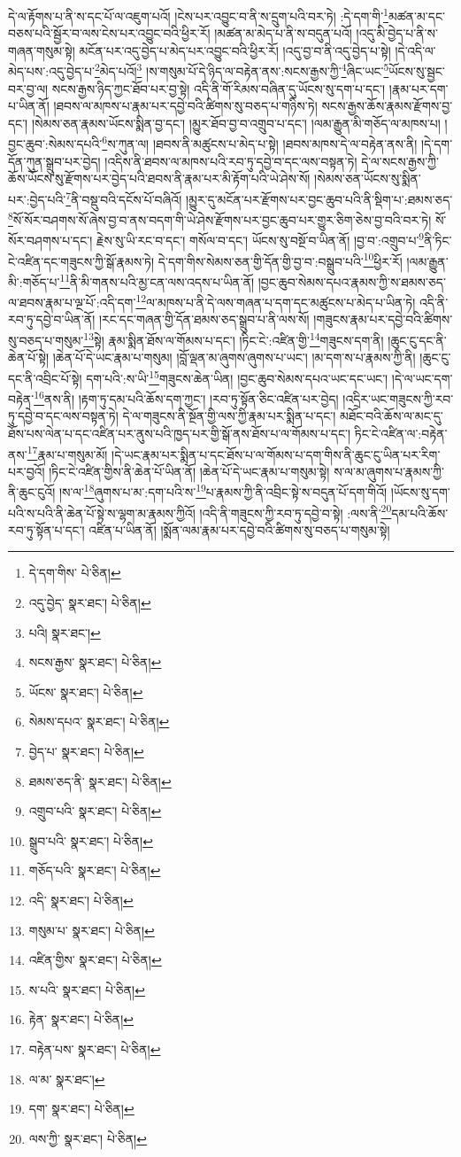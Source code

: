 དེ་ལ་རྟོགས་པ་ནི་ས་དང་པོ་ལ་འཇུག་པའོ། །ངེས་པར་འབྱུང་བ་ནི་ས་དྲུག་པའི་བར་ཏེ། :དེ་དག་གི་\footnote{དེ་དག་གིས་  པེ་ཅིན། }མཚན་མ་དང་བཅས་པའི་སྦྱོར་བ་ལས་ངེས་པར་འབྱུང་བའི་ཕྱིར་རོ། །མཚན་མ་མེད་པ་ནི་ས་བདུན་པའོ། །འདུ་མི་བྱེད་པ་ནི་ས་གཞན་གསུམ་སྟེ། མངོན་པར་འདུ་བྱེད་པ་མེད་པར་འབྱུང་བའི་ཕྱིར་རོ། །འདུ་བྱ་བ་ནི་འདུ་བྱེད་པ་སྟེ། །དེ་འདི་ལ་མེད་པས་:འདུ་བྱེད་པ་\footnote{འདུ་བྱེད་  སྣར་ཐང་།  པེ་ཅིན། }མེད་པའོ།\footnote{པའི།  སྣར་ཐང་། } །ས་གསུམ་པོ་དེ་ཉིད་ལ་བརྟེན་ནས་:སངས་རྒྱས་ཀྱི་\footnote{སངས་རྒྱས་  སྣར་ཐང་།  པེ་ཅིན། }ཞིང་ཡང་\footnote{ཡོངས་  སྣར་ཐང་།  པེ་ཅིན། }ཡོངས་སུ་སྦྱང་བར་བྱ་ལ། སངས་རྒྱས་ཉིད་ཀྱང་ཐོབ་པར་བྱ་སྟེ། འདི་ནི་གོ་རིམས་བཞིན་དུ་ཡོངས་སུ་དག་པ་དང་། །རྣམ་པར་དག་པ་ཡིན་ནོ། །ཐབས་ལ་མཁས་པ་རྣམ་པར་དབྱེ་བའི་ཚིགས་སུ་བཅད་པ་གཉིས་ཏེ། སངས་རྒྱས་ཆོས་རྣམས་རྫོགས་བྱ་དང་། །སེམས་ཅན་རྣམས་ཡོངས་སྨིན་བྱ་དང་། །མྱུར་ཐོབ་བྱ་བ་འགྲུབ་པ་དང་། །ལམ་རྒྱུན་མི་གཅོད་ལ་མཁས་པ། །བྱང་ཆུབ་:སེམས་དཔའི་\footnote{སེམས་དཔའ་  སྣར་ཐང་།  པེ་ཅིན། }ས་ཀུན་ལ། །ཐབས་ནི་མཚུངས་པ་མེད་པ་སྟེ། །ཐབས་མཁས་དེ་ལ་བརྟེན་ནས་ནི། །དེ་དག་དོན་ཀུན་སྒྲུབ་པར་བྱེད། །འདིས་ནི་ཐབས་ལ་མཁས་པའི་རབ་ཏུ་དབྱེ་བ་དང་ལས་བསྟན་ཏེ། དེ་ལ་སངས་རྒྱས་ཀྱི་ཆོས་ཡོངས་སུ་རྫོགས་པར་བྱེད་པའི་ཐབས་ནི་རྣམ་པར་མི་རྟོག་པའི་ཡེ་ཤེས་སོ། །སེམས་ཅན་ཡོངས་སུ་སྨིན་པར་:བྱེད་པའི་\footnote{བྱེད་པ་  སྣར་ཐང་།  པེ་ཅིན། }ནི་བསྡུ་བའི་དངོས་པོ་བཞིའོ། །མྱུར་དུ་མངོན་པར་རྫོགས་པར་བྱང་ཆུབ་པའི་ནི་སྡིག་པ་:ཐམས་ཅད་\footnote{ཐམས་ཅད་ནི་  སྣར་ཐང་།  པེ་ཅིན། }སོ་སོར་བཤགས་སོ་ཞེས་བྱ་བ་ནས་བདག་གི་ཡེ་ཤེས་རྫོགས་པར་བྱང་ཆུབ་པར་གྱུར་ཅིག་ཅེས་བྱ་བའི་བར་ཏེ། སོ་སོར་བཤགས་པ་དང་། རྗེས་སུ་ཡི་རང་བ་དང་། གསོལ་བ་དང་། ཡོངས་སུ་བསྔོ་བ་ཡིན་ནོ། །བྱ་བ་:འགྲུབ་པ་\footnote{འགྲུབ་པའི་  སྣར་ཐང་།  པེ་ཅིན། }ནི་ཏིང་ངེ་འཛིན་དང་གཟུངས་ཀྱི་སྒོ་རྣམས་ཏེ། དེ་དག་གིས་སེམས་ཅན་གྱི་དོན་གྱི་བྱ་བ་:བསྒྲུབ་པའི་\footnote{སྒྲུབ་པའི་  སྣར་ཐང་།  པེ་ཅིན། }ཕྱིར་རོ། །ལམ་རྒྱུན་མི་:གཅོད་པ་\footnote{གཅོད་པའི་  སྣར་ཐང་།  པེ་ཅིན། }ནི་མི་གནས་པའི་མྱ་ངན་ལས་འདས་པ་ཡིན་ནོ། །བྱང་ཆུབ་སེམས་དཔའ་རྣམས་ཀྱི་ས་ཐམས་ཅད་ལ་ཐབས་རྣམ་པ་ལྔ་པོ་:འདི་དག་\footnote{འདི་  སྣར་ཐང་།  པེ་ཅིན། }ལ་མཁས་པ་ནི་དེ་ལས་གཞན་པ་དག་དང་མཚུངས་པ་མེད་པ་ཡིན་ཏེ། འདི་ནི་རབ་ཏུ་དབྱེ་བ་ཡིན་ནོ། །རང་དང་གཞན་གྱི་དོན་ཐམས་ཅད་སྒྲུབ་པ་ནི་ལས་སོ། །གཟུངས་རྣམ་པར་དབྱེ་བའི་ཚིགས་སུ་བཅད་པ་གསུམ་\footnote{གསུམ་པ་  སྣར་ཐང་།  པེ་ཅིན། }སྟེ། རྣམ་སྨིན་ཐོས་ལ་གོམས་པ་དང་། །ཏིང་ངེ་:འཛིན་གྱི་\footnote{འཛིན་གྱིས་  སྣར་ཐང་།  པེ་ཅིན། }གཟུངས་དག་ནི། །ཆུང་ངུ་དང་ནི་ཆེན་པོ་སྟེ། །ཆེན་པོ་དེ་ཡང་རྣམ་པ་གསུམ། །བློ་ལྡན་མ་ཞུགས་ཞུགས་པ་ཡང་། །མ་དག་ས་པ་རྣམས་ཀྱི་ནི། །ཆུང་ངུ་དང་ནི་འབྲིང་པོ་སྟེ། དག་པའི་:ས་ཡི་\footnote{ས་པའི་  སྣར་ཐང་།  པེ་ཅིན། }གཟུངས་ཆེན་ཡིན། །བྱང་ཆུབ་སེམས་དཔའ་ཡང་དང་ཡང་། །དེ་ལ་ཡང་དག་བརྟེན་\footnote{རྟེན་  སྣར་ཐང་།  པེ་ཅིན། }ནས་ནི། །རྟག་ཏུ་དམ་པའི་ཆོས་དག་ཀྱང་། །རབ་ཏུ་སྟོན་ཅིང་འཛིན་པར་བྱེད། །འདྲིར་ཡང་གཟུངས་ཀྱི་རབ་ཏུ་དབྱེ་བ་དང་ལས་བསྟན་ཏེ། དེ་ལ་གཟུངས་ནི་སྔོན་གྱི་ལས་ཀྱི་རྣམ་པར་སྨིན་པ་དང་། མཐོང་བའི་ཆོས་ལ་མང་དུ་ཐོས་པས་ལེན་པ་དང་འཛིན་པར་ནུས་པའི་ཁྱད་པར་གྱི་སྒོ་ནས་ཐོས་པ་ལ་གོམས་པ་དང་། ཏིང་ངེ་འཛིན་ལ་:བརྟེན་ནས་\footnote{བརྟེན་པས་  སྣར་ཐང་།  པེ་ཅིན། }རྣམ་པ་གསུམ་མོ། །དེ་ཡང་རྣམ་པར་སྨིན་པ་དང་ཐོས་པ་ལ་གོམས་པ་དག་གིས་ནི་ཆུང་ངུ་ཡིན་པར་རིག་པར་བྱའོ། །ཏིང་ངེ་འཛིན་གྱིས་ནི་ཆེན་པོ་ཡིན་ནོ། །ཆེན་པོ་དེ་ཡང་རྣམ་པ་གསུམ་སྟེ། ས་ལ་མ་ཞུགས་པ་རྣམས་ཀྱི་ནི་ཆུང་ངུའོ། །ས་ལ་\footnote{ལ་མ་  སྣར་ཐང་། }ཞུགས་པ་མ་:དག་པའི་ས་\footnote{དག་  སྣར་ཐང་།  པེ་ཅིན། }པ་རྣམས་ཀྱི་ནི་འབྲིང་སྟེ་ས་བདུན་པོ་དག་གིའོ། །ཡོངས་སུ་དག་པའི་ས་པའི་ནི་ཆེན་པོ་སྟེ་ས་ལྷག་མ་རྣམས་ཀྱིའོ། །འདི་ནི་གཟུངས་ཀྱི་རབ་ཏུ་དབྱེ་བ་སྟེ། :ལས་ནི་\footnote{ལས་ཀྱི་  སྣར་ཐང་།  པེ་ཅིན། }དམ་པའི་ཆོས་རབ་ཏུ་སྟོན་པ་དང་། འཛིན་པ་ཡིན་ནོ། །སྨོན་ལམ་རྣམ་པར་དབྱེ་བའི་ཚིགས་སུ་བཅད་པ་གསུམ་སྟེ། 